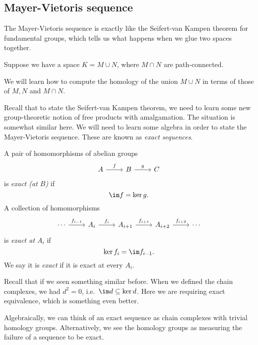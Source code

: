 \documentclass[a4paper]{article}
\begin{document}
\subsection{Mayer-Vietoris sequence}
The Mayer-Vietoris sequence is exactly like the Seifert-van Kampen theorem for fundamental groups, which tells us what happens when we glue two spaces together.

Suppose we have a space $K = M\cup N$, where $M \cap N$ are path-connected.
\begin{center}
\end{center}
We will learn how to compute the homology of the union $M\cup N$ in terms of those of $M, N$ and $M\cap N$.

Recall that to state the Seifert-van Kampen theorem, we need to learn some new group-theoretic notion of free products with amalgamation. The situation is somewhat similar here. We will need to learn some algebra in order to state the Mayer-Vietoris sequence. These are known as \emph{exact sequences}.

\begin{defi}
  A pair of homomorphisms of abelian groups
  \[
    \begin{tikzcd}
      A \ar [r, "f"] & B \ar [r, "g"] & C
    \end{tikzcd}
  \]
  is \emph{exact (at $B$)} if
  \[
    \im f = \ker g.
  \]
  A collection of homomorphisms
  \[
    \begin{tikzcd}
      \cdots \ar [r, "f_{i - 1}"] & A_{i} \ar [r, "f_i"] & A_{i + 1} \ar [r, "f_{i + 1}"] & A_{i + 2} \ar[r, "f_{i + 2}"] & \cdots
    \end{tikzcd}
  \]
  is \emph{exact at $A_i$} if
  \[
    \ker f_i= \im f_{i - 1}.
  \]
  We say it is \emph{exact} if it is exact at every $A_i$.
\end{defi}
Recall that if we seen something similar before. When we defined the chain complexes, we had $d^2 = 0$, i.e.\ $\im d \subseteq \ker d$. Here we are requiring exact equivalence, which is something even better.

Algebraically, we can think of an exact sequence as chain complexes with trivial homology groups. Alternatively, we see the homology groups as measuring the failure of a sequence to be exact.
\end{document}
